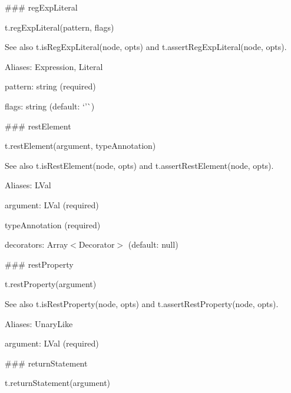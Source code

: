 \#\#\# reg\+Exp\+Literal 
\begin{DoxyCode}
t.regExpLiteral(pattern, flags)
\end{DoxyCode}


See also {\ttfamily t.\+is\+Reg\+Exp\+Literal(node, opts)} and {\ttfamily t.\+assert\+Reg\+Exp\+Literal(node, opts)}.

Aliases\+: {\ttfamily Expression}, {\ttfamily Literal}


\begin{DoxyItemize}
\item {\ttfamily pattern}\+: {\ttfamily string} (required)
\item {\ttfamily flags}\+: {\ttfamily string} (default\+: `'\textquotesingle{}\`{}) 


\end{DoxyItemize}

\#\#\# rest\+Element 
\begin{DoxyCode}
t.restElement(argument, typeAnnotation)
\end{DoxyCode}


See also {\ttfamily t.\+is\+Rest\+Element(node, opts)} and {\ttfamily t.\+assert\+Rest\+Element(node, opts)}.

Aliases\+: {\ttfamily L\+Val}


\begin{DoxyItemize}
\item {\ttfamily argument}\+: {\ttfamily L\+Val} (required)
\item {\ttfamily type\+Annotation} (required)
\item {\ttfamily decorators}\+: {\ttfamily Array$<$Decorator$>$} (default\+: {\ttfamily null}) 


\end{DoxyItemize}

\#\#\# rest\+Property 
\begin{DoxyCode}
t.restProperty(argument)
\end{DoxyCode}


See also {\ttfamily t.\+is\+Rest\+Property(node, opts)} and {\ttfamily t.\+assert\+Rest\+Property(node, opts)}.

Aliases\+: {\ttfamily Unary\+Like}


\begin{DoxyItemize}
\item {\ttfamily argument}\+: {\ttfamily L\+Val} (required) 


\end{DoxyItemize}

\#\#\# return\+Statement 
\begin{DoxyCode}
t.returnStatement(argument)
\end{DoxyCode}



